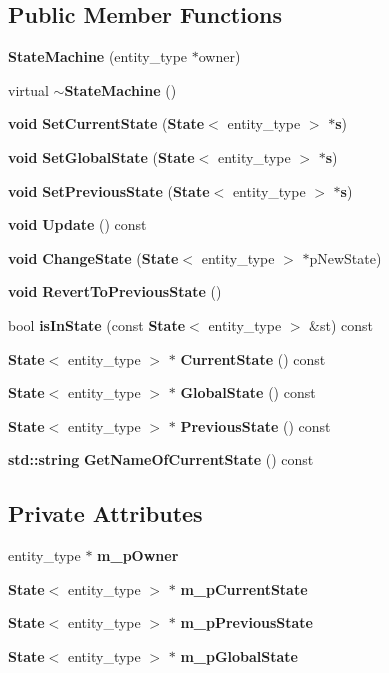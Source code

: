 \subsection*{Public Member Functions}
\begin{DoxyCompactItemize}
\item 
{\bf State\+Machine} (entity\+\_\+type $\ast$owner)
\item 
virtual {\bf $\sim$\+State\+Machine} ()
\item 
{\bf void} {\bf Set\+Current\+State} ({\bf State}$<$ entity\+\_\+type $>$ $\ast${\bf s})
\item 
{\bf void} {\bf Set\+Global\+State} ({\bf State}$<$ entity\+\_\+type $>$ $\ast${\bf s})
\item 
{\bf void} {\bf Set\+Previous\+State} ({\bf State}$<$ entity\+\_\+type $>$ $\ast${\bf s})
\item 
{\bf void} {\bf Update} () const 
\item 
{\bf void} {\bf Change\+State} ({\bf State}$<$ entity\+\_\+type $>$ $\ast$p\+New\+State)
\item 
{\bf void} {\bf Revert\+To\+Previous\+State} ()
\item 
bool {\bf is\+In\+State} (const {\bf State}$<$ entity\+\_\+type $>$ \&st) const 
\item 
{\bf State}$<$ entity\+\_\+type $>$ $\ast$ {\bf Current\+State} () const 
\item 
{\bf State}$<$ entity\+\_\+type $>$ $\ast$ {\bf Global\+State} () const 
\item 
{\bf State}$<$ entity\+\_\+type $>$ $\ast$ {\bf Previous\+State} () const 
\item 
{\bf std\+::string} {\bf Get\+Name\+Of\+Current\+State} () const 
\end{DoxyCompactItemize}
\subsection*{Private Attributes}
\begin{DoxyCompactItemize}
\item 
entity\+\_\+type $\ast$ {\bf m\+\_\+p\+Owner}
\item 
{\bf State}$<$ entity\+\_\+type $>$ $\ast$ {\bf m\+\_\+p\+Current\+State}
\item 
{\bf State}$<$ entity\+\_\+type $>$ $\ast$ {\bf m\+\_\+p\+Previous\+State}
\item 
{\bf State}$<$ entity\+\_\+type $>$ $\ast$ {\bf m\+\_\+p\+Global\+State}
\end{DoxyCompactItemize}


